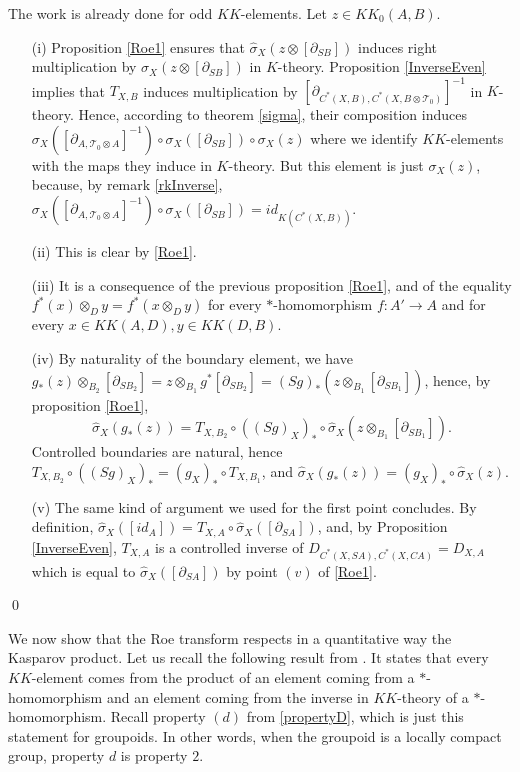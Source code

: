 \begin{dem} The work is already done for odd $KK$-elements. Let $z\in KK_0(A,B)$.
\begin{enumerate}
\item[(i)] Proposition \ref{Roe1} ensures that $\hat \sigma_X(z\otimes [\partial_{SB}])$ induces right multiplication by $\sigma_X(z\otimes [\partial_{SB}])$ in $K$-theory. Proposition \ref{InverseEven} implies that $T_{X,B}$ induces multiplication by $[\partial_{C^*(X,B),C^*(X,B\otimes\mathcal T_0)}]^{-1}$ in $K$-theory. Hence, according to theorem \ref{sigma}, their composition induces $ \sigma_X([\partial_{A,\mathcal T_0 \otimes  A}]^{-1})\circ\sigma_X([\partial_{SB}])\circ\sigma_X(z)$ where we identify $KK$-elements with the maps they induce in $K$-theory. But this element is just $\sigma_X(z)$, because, by remark \ref{rkInverse}, $\sigma_X([\partial_{A,\mathcal T_0 \otimes  A}]^{-1})\circ\sigma_X([\partial_{SB}])= id_{K(C^*(X,B))}$.
\item[(ii)] This is clear by \ref{Roe1}.
\item[(iii)] It is a consequence of the previous proposition \ref{Roe1}, and of the equality $f^*(x)\otimes_D y = f^*(x\otimes_D y)$ for every $*$-homomorphism $f : A'\rightarrow A$ and for every $x\in KK(A,D),y\in KK(D,B)$.
\item[(iv)] By naturality of the boundary element, we have $g_*(z)\otimes_{B_2} [\partial_{SB_2}] = z\otimes_{B_1} g^{*}[\partial _{SB_2}] = (Sg)_{*}(z\otimes_{B_1} [\partial _{SB_1}])$, hence, by proposition \ref{Roe1}, 
\[\hat\sigma_X(g_*(z)) = T_{X,B_2}\circ ((Sg)_X)_* \circ \hat\sigma_{X}(z\otimes_{B_1} [\partial_{SB_1}]).\]
Controlled boundaries are natural, hence $T_{X,B_2}\circ ((Sg)_X)_* = (g_X)_* \circ T_{X,B_1}$, and $\hat\sigma_X(g_*(z)) =(g_X)_* \circ \hat\sigma_X(z)$.
\item[(v)] The same kind of argument we used for the first point concludes. By definition, $\hat\sigma_X([id_A]) = T_{X,A}\circ \hat\sigma_X([\partial_{SA}])$, and, by Proposition \ref{InverseEven}, $T_{X,A}$ is a controlled inverse of $D_{C^*(X,SA),C^*(X,CA)} = D_{X,A}$ which is equal to $\hat\sigma_X([\partial_{SA}])$ by point $(v)$ of \ref{Roe1}.
\end{enumerate}
\qed
\end{dem}

We now show that the Roe transform respects in a quantitative way the Kasparov product. Let us recall the following result from \cite{lafforgue2002k}. It states that every $KK$-element comes from the product of an element coming from a $*$-homomorphism and an element coming from the inverse in $KK$-theory of a $*$-homomorphism. Recall property $(d)$ from \ref{propertyD}, which is just this statement for groupoids. In other words, when the groupoid is a locally compact group, property $d$ is property $2$.

